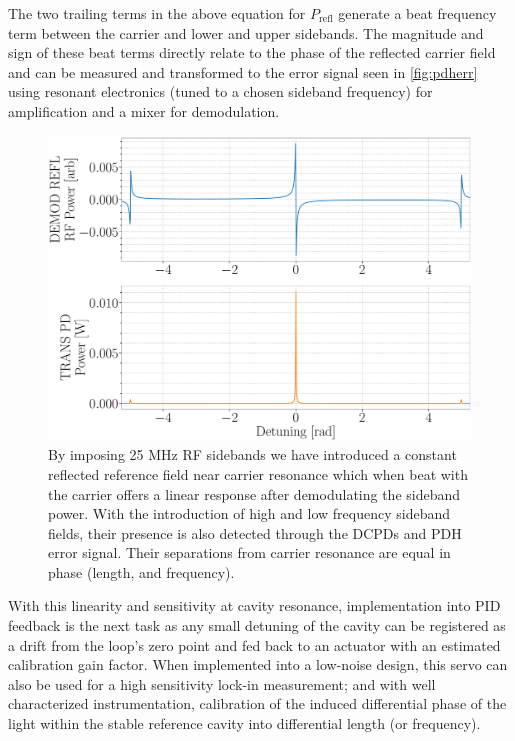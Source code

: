 The two trailing terms in the above equation for $P_\mathrm{refl}$ generate a beat frequency term between the carrier and lower and upper sidebands. The magnitude and sign of these beat terms directly relate to the phase of the reflected carrier field and can be measured and transformed to the error signal seen in \autoref{fig:pdherr} using resonant electronics (tuned to a chosen sideband frequency) for amplification and a mixer for demodulation.

\begin{figure}[H]
	\includegraphics[width=\textwidth]{figs/ALGAAS/pdh_error.pdf}
	\caption{By imposing 25 MHz RF sidebands we have introduced a constant reflected reference field near carrier resonance which when beat with the carrier offers a linear response after demodulating the sideband power. With the introduction of high and low frequency sideband fields, their presence is also detected through the DCPDs and PDH error signal. Their separations from carrier resonance are equal in phase (length, and frequency).}
\label{fig:pdherr}
\end{figure}

With this linearity and sensitivity at cavity resonance, implementation into PID feedback is the next task as any small detuning of the cavity can be registered as a drift from the loop's zero point and fed back to an actuator with an estimated calibration gain factor. When implemented into a low-noise design, this servo can also be used for a high sensitivity lock-in measurement; and with well characterized instrumentation, calibration of the induced differential phase of the light within the stable reference cavity into differential length (or frequency).


